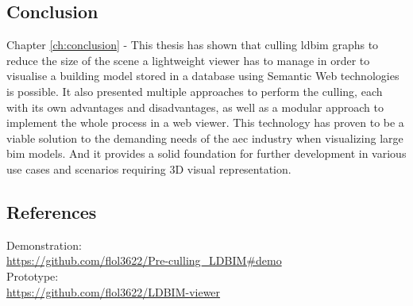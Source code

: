 \begin{refsection}
\begin{multicols}{2}
        \subsection*{Conclusion}
        \textsf{Chapter \ref{ch:conclusion} -} This thesis has shown that culling \ac{ldbim} graphs to reduce the size of the scene a lightweight viewer has to manage in order to visualise a building model stored in a database using Semantic Web technologies is possible. It also presented multiple approaches to perform the culling, each with its own advantages and disadvantages, as well as a modular approach to implement the whole process in a web viewer. This technology has proven to be a viable solution to the demanding needs of the \ac{aec} industry when visualizing large \ac{bim} models. And it provides a solid foundation for further development in various use cases and scenarios requiring 3D visual representation.

        \subsection*{References}
        {\renewcommand*{\bibfont}{\small}
            \printbibliography}
        {\footnotesize
            \textsf{Demonstration:}\\
            \url{https://github.com/flol3622/Pre-culling_LDBIM#demo}\\
            \textsf{Prototype:}\\
            \url{https://github.com/flol3622/LDBIM-viewer}}


    \end{multicols}

\end{refsection}